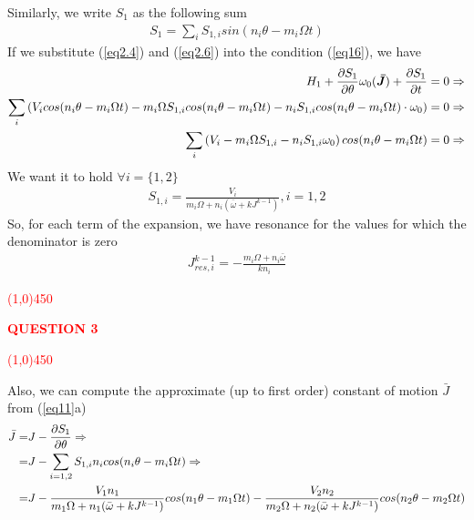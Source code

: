 Similarly, we write $S_1$ as the following sum
	\begin{align}\label{eq2.6}
		S_1 = \sum_{i} S_{1,i} sin(n_i\theta-m_i\Omega t) 
	\end{align}
If we substitute (\ref{eq2.4}) and (\ref{eq2.6}) into the condition (\ref{eq16}), we have 
	\begin{align*}
		H_1 + \pdv{S_1}{\theta} \omega_0(\bm{\bar{J}})+ \pdv{S_1}{t} = 0 \Rightarrow\\
		\sum_i \left( V_icos(n_i\theta-m_i\Omega t) -m_i\Omega S_{1,i}cos(n_i\theta-m_i\Omega t)  -n_iS_{1,i}cos(n_i\theta-m_i\Omega t)  \cdot \omega_0 \right) = 0 \Rightarrow \\ 
		\sum_i\left( V_i - m_i\Omega S_{1,i}-n_iS_{1,i}\omega_0\right)cos(n_i\theta-m_i\Omega t) =0 \Rightarrow\\ 
	\end{align*}
We want it to hold $\forall i=\{1,2\}$
	\begin{align}\label{eq2.7}
		S_{1,i} = \frac{V_i}{m_i\Omega + n_i(\bar{\omega}+kJ^{k-1})}, i=1,2
	\end{align}
So, for each term of the expansion, we have resonance for the values for which the denominator is zero 
	\begin{align}\label{eq2.8}
		J_{res,i}^{k-1} = - \frac{m_i\Omega + n_i\bar{\omega}}{kn_i}
	\end{align}
%
%
%
%
%
\textcolor{red}{
\line(1,0){450}\\
\begin{center}
	\textbf{QUESTION 3}
\end{center}
\line(1,0){450}\\
}

Also, we can compute the approximate (up to first order) constant of motion $\bar{J}$ from (\ref{eq11}a)
	\begin{align*}
		\bar{J} =& J - \pdv{S_1}{\theta} \Rightarrow\\ 
		        =& J - \sum_{i=1,2}S_{1,i}n_i cos(n_i\theta-m_i\Omega t)\Rightarrow\\ 
		        =& J - \frac{V_1n_1}{m_1\Omega + n_1(\bar{\omega}+kJ^{k-1})}cos(n_1\theta-m_1\Omega t) -\frac{V_2n_2}{m_2\Omega + n_2(\bar{\omega}+kJ^{k-1})} cos(n_2\theta-m_2\Omega t)
	\end{align*}


